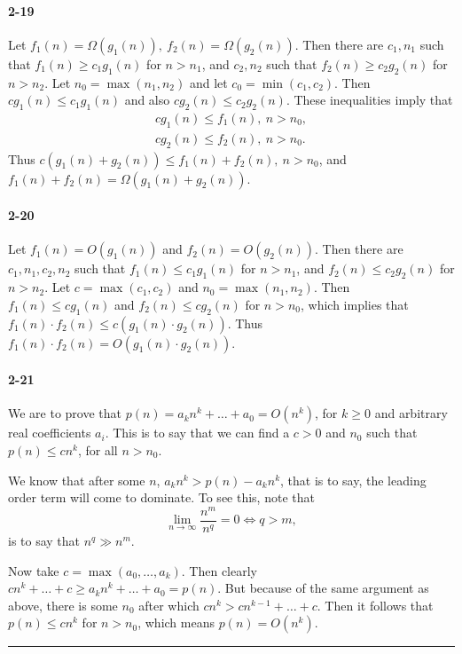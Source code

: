 \documentclass{report}
\newcommand{\okthen}{\rule[-1.4pt]{0.3em}{0.77em}}
\begin{document}
\paragraph{2-19} Let $f_1(n) = \Omega(g_1(n)),\ f_2(n) = \Omega(g_2(n))$. Then there are $c_1, n_1$ such that $f_1(n) \ge c_1 g_1(n)$ for $n > n_1$, and $c_2, n_2$ such that $f_2(n) \ge c_2 g_2(n)$ for $n > n_2$. Let $n_0 = \max(n_1, n_2)$ and let $c_0 = \min(c_1, c_2)$. Then $c g_1(n) \le c_1 g_1(n)$ and also $c g_2(n) \le c_2 g_2(n)$. These inequalities imply that
\begin{gather*}
	c g_1(n) \le f_1(n),\ n > n_0, \\
	c g_2(n) \le f_2(n),\ n > n_0.
\end{gather*}
Thus $c(g_1(n) + g_2(n)) \le f_1(n) + f_2(n),\ n > n_0$, and $f_1(n) + f_2(n) = \Omega(g_1(n) + g_2(n))$.

\paragraph{2-20} Let $f_1(n) = O(g_1(n))$ and $f_2(n) = O(g_2(n))$. Then there are $c_1, n_1, c_2, n_2$ such that $f_1(n) \le c_1 g_1(n)$ for $n > n_1$, and $f_2(n) \le c_2 g_2(n)$ for $n > n_2$. Let $c = \max(c_1, c_2)$ and $n_0 = \max(n_1, n_2)$. Then $f_1(n) \le c g_1(n)$ and $f_2(n) \le c g_2(n)$ for $n > n_0$, which implies that $f_1(n)\cdot f_2(n) \le c(g_1(n)\cdot g_2(n))$. Thus $f_1(n)\cdot f_2(n) = O(g_1(n)\cdot g_2(n))$.

\paragraph{2-21} We are to prove that $p(n) = a_k n^k + \ldots + a_0 = O(n^k)$, for $k \ge 0$ and arbitrary real coefficients $a_i$. This is to say that we can find a $c > 0$ and $n_0$ such that $p(n) \le c n^k$, for all $n > n_0$.

\medskip

We know that after some $n$, $a_k n^k > p(n) - a_k n^k$, that is to say, the leading order term will come to dominate. To see this, note that
\[ \lim_{n\to\infty}\frac{n^m}{n^q} = 0 \iff q > m, \]
is to say that $n^q \gg n^m$.

Now take $c = \max(a_0,\ldots, a_k)$. Then clearly $c n^k + \ldots + c \ge a_k n^k + \ldots + a_0 = p(n)$. But because of the same argument as above, there is some $n_0$ after which $c n^k > c n^{k-1} + \ldots + c$. Then it follows that $p(n) \le c n^k$ for $n > n_0$, which means $p(n) = O(n^k)$.\ \okthen
\end{document}
